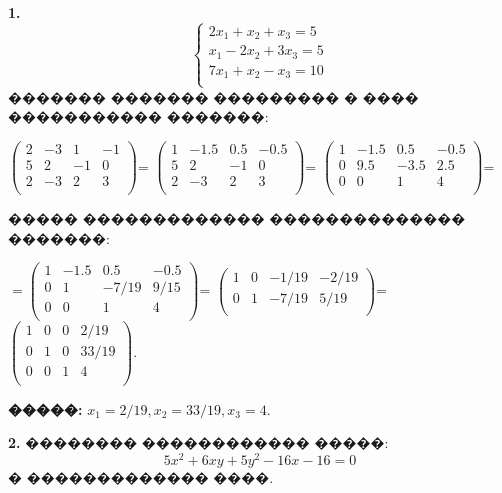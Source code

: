 \documentclass{article}
\begin{document}
\textbf{1.}
$$
\left\{
\begin{array}{l}
2x_1+x_2+x_3=5\\
x_1-2x_2+3x_3=5\\
7x_1+x_2-x_3=10\\
\end{array}\right.
$$
������� ������� ��������� � ���� ����������� �������:

$	\left(
\begin{array}{ccc|c}
2&-3&1&-1\\
5&2&-1&0\\
2&-3&2&3\\
\end{array}\right)  $=
$	\left(
\begin{array}{ccc|c}
1&-1.5&0.5&-0.5\\
5&2&-1&0\\
2&-3&2&3\\
\end{array}\right)  $=
$	\left(
\begin{array}{ccc|c}
1&-1.5&0.5&-0.5\\
0&9.5&-3.5&2.5\\
0&0&1&4\\
\end{array}\right)  $=

����� ������������� �������������� �������:

$=	\left(
\begin{array}{ccc|c}
1&-1.5&0.5&-0.5\\
0&1&-7/19&9/15\\
0&0&1&4\\
\end{array}\right)  $=
$	\left(
\begin{array}{ccc|c}
1&0&-1/19&-2/19\\
0&1&-7/19&5/19\\
\end{array}\right)  $=
$	\left(
\begin{array}{ccc|c}
1&0&0&2/19\\
0&1&0&33/19\\
0&0&1&4\\
\end{array}\right). $
\begin{flushright}
\textbf{�����:} $	x_1=2/19, x_2=33/19, x_3=4.$
\end{flushright}



\textbf{2.} �������� ������������ �����:
$$5x^2+6xy+5y^2-16x-16=0$$ � ������������� ����.
\end{document}

